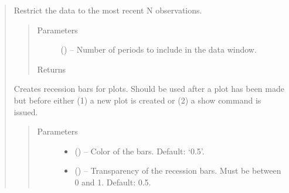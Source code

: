 \documentclass[letterpaper,10pt,openany,oneside,english]{sphinxmanual}
\begin{document}
\begin{fulllineitems}
\begin{quote}
\begin{fulllineitems}
\end{fulllineitems}


\begin{fulllineitems}
\label{\detokenize{series_class:fredpy.series.recent}}
Restrict the data to the most recent N observations.
\begin{quote}\begin{description}
\item[{Parameters}] \leavevmode
{} (\href{https://docs.python.org/2/library/functions.html\#int}{}) -- Number of periods to include in the data window.

\item[{Returns}] \leavevmode
{\hyperref[\detokenize{series_class:fredpy.series}]{}}

\end{description}\end{quote}

\end{fulllineitems}


\begin{fulllineitems}
\label{\detokenize{series_class:fredpy.series.recessions}}
Creates recession bars for plots. Should be used after a plot has been made but before either (1) a new plot is created or (2) a show command is issued.
\begin{quote}\begin{description}
\item[{Parameters}] \leavevmode\begin{itemize}
\item {} 
 (\href{https://docs.python.org/2/library/string.html\#module-string}{}) -- Color of the bars. Default: `0.5'.

\item {} 
 (\href{https://docs.python.org/2/library/functions.html\#float}{}) -- Transparency of the recession bars. Must be between 0 and 1. Default: 0.5.

\end{itemize}


\end{description}
\end{quote}
\end{fulllineitems}
\end{quote}
\end{fulllineitems}
\end{document}

